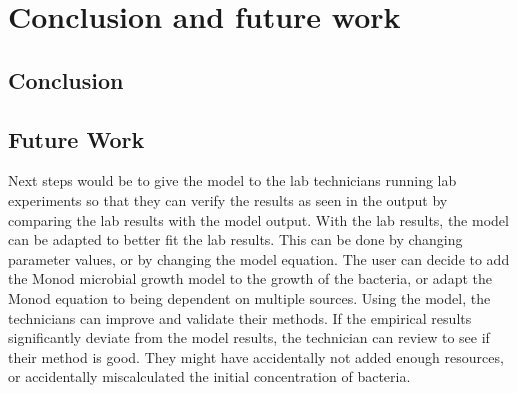 \chapter{Conclusion and future work}
\label{CAFW}

\section{Conclusion}
\label{Conclusion}

\section{Future Work}
\label{Future Work}
Next steps would be to give the model to the lab technicians running lab experiments so that they can verify the results as seen in the output by comparing the lab results with the model output. 
With the lab results, the model can be adapted to better fit the lab results. 
This can be done by changing parameter values, or by changing the model equation. 
The user can decide to add the Monod microbial growth model to the growth of the bacteria, or adapt the Monod equation to being dependent on multiple sources. 
Using the model, the technicians can improve and validate their methods. 
If the empirical results significantly deviate from the model results, the technician can review to see if their method is good. 
They might have accidentally not added enough resources, or accidentally miscalculated the initial concentration of bacteria. 

